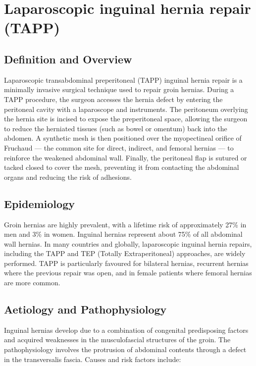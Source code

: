 \chapter{Laparoscopic inguinal hernia repair (TAPP)}

\section*{Definition and Overview}
Laparoscopic transabdominal preperitoneal (TAPP) inguinal hernia repair is a minimally invasive surgical technique used to repair groin hernias. During a TAPP procedure, the surgeon accesses the hernia defect by entering the peritoneal cavity with a laparoscope and instruments. The peritoneum overlying the hernia site is incised to expose the preperitoneal space, allowing the surgeon to reduce the herniated tissues (such as bowel or omentum) back into the abdomen. A synthetic mesh is then positioned over the myopectineal orifice of Fruchaud --- the common site for direct, indirect, and femoral hernias --- to reinforce the weakened abdominal wall. Finally, the peritoneal flap is sutured or tacked closed to cover the mesh, preventing it from contacting the abdominal organs and reducing the risk of adhesions.

\section*{Epidemiology}
Groin hernias are highly prevalent, with a lifetime risk of approximately 27\% in men and 3\% in women. Inguinal hernias represent about 75\% of all abdominal wall hernias. In many countries and globally, laparoscopic inguinal hernia repairs, including the TAPP and TEP (Totally Extraperitoneal) approaches, are widely performed. TAPP is particularly favoured for bilateral hernias, recurrent hernias where the previous repair was open, and in female patients where femoral hernias are more common.

\section*{Aetiology and Pathophysiology}
Inguinal hernias develop due to a combination of congenital predisposing factors and acquired weaknesses in the musculofascial structures of the groin. The pathophysiology involves the protrusion of abdominal contents through a defect in the transversalis fascia. Causes and risk factors include:

